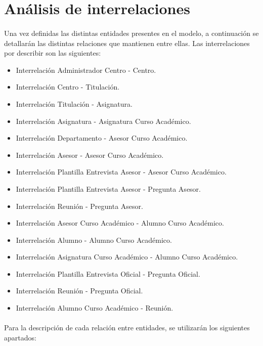 \section{Análisis de interrelaciones}

   \paragraph{}Una vez definidas las distintas entidades presentes en el
   modelo, a continuación se detallarán las distintas relaciones que mantienen
   entre ellas. Las interrelaciones por describir son las siguientes:

   \begin{itemize}
    \item Interrelación Administrador Centro - Centro.
    \item Interrelación Centro - Titulación.
    \item Interrelación Titulación - Asignatura.
    \item Interrelación Asignatura - Asignatura Curso Académico.
    \item Interrelación Departamento - Asesor Curso Académico.
    \item Interrelación Asesor - Asesor Curso Académico.
    \item Interrelación Plantilla Entrevista Asesor - Asesor Curso Académico.
    \item Interrelación Plantilla Entrevista Asesor - Pregunta Asesor.
    \item Interrelación Reunión - Pregunta Asesor.
    \item Interrelación Asesor Curso Académico - Alumno Curso Académico.
    \item Interrelación Alumno - Alumno Curso Académico.
    \item Interrelación Asignatura Curso Académico - Alumno Curso Académico.
    \item Interrelación Plantilla Entrevista Oficial - Pregunta Oficial.
    \item Interrelación Reunión - Pregunta Oficial.
    \item Interrelación Alumno Curso Académico - Reunión.
   \end{itemize}

   \paragraph{}Para la descripción de cada relación entre entidades, se
   utilizarán los siguientes apartados:

